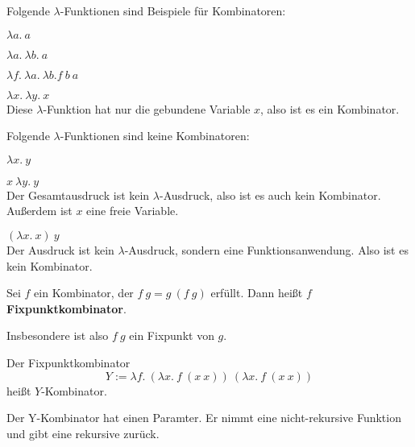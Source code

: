\begin{beispiel}%
    Folgende $\lambda$-Funktionen sind Beispiele für Kombinatoren:
    \begin{bspenum}
        \item $\lambda a.\ a$
        \item $\lambda a.\ \lambda b.\ a$
        \item $\lambda f.\ \lambda a.\ \lambda b. f\ b\ a$
        \item $\lambda x.\ \lambda y.\ x$\\
              Diese $\lambda$-Funktion hat nur die gebundene Variable $x$, also
              ist es ein Kombinator.
    \end{bspenum}

    Folgende $\lambda$-Funktionen sind keine Kombinatoren:
    \begin{bspenum}
        \item $\lambda x.\ y$
        \item $x\ \lambda y.\ y$\\
              Der Gesamtausdruck ist kein $\lambda$-Ausdruck, also ist es auch
              kein Kombinator. Außerdem ist $x$ eine freie Variable.
        \item $(\lambda x.\ x)\ y$\\
              Der Ausdruck ist kein $\lambda$-Ausdruck, sondern eine
              Funktionsanwendung. Also ist es kein Kombinator.
    \end{bspenum}
\end{beispiel}

\begin{definition}%
    Sei $f$ ein Kombinator, der $f\ g = g\ (f\ g)$ erfüllt. Dann heißt $f$
    \textbf{Fixpunktkombinator}.
\end{definition}

Insbesondere ist also $f \ g$ ein Fixpunkt von $g$.

\begin{definition}[Y-Kombinator]%
    Der Fixpunktkombinator
    \[Y := \lambda f.\ (\lambda x.\ f\ (x\ x))\ (\lambda x.\ f\ (x\ x))\]
    heißt $Y$-Kombinator.
\end{definition}

Der Y-Kombinator hat einen Paramter. Er nimmt eine nicht-rekursive Funktion
und gibt eine rekursive zurück.

